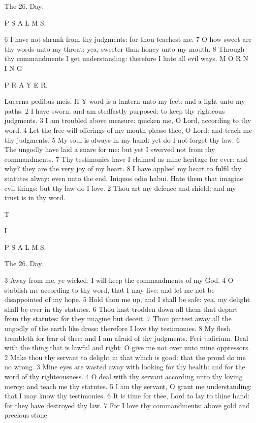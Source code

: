 The 26. Day.

P S A L M S.

6 I have not shrunk from thy judgments: for thou teachest me. 7 O how sweet are thy words unto my throat: yea, sweeter than honey unto my mouth. 8 Through thy commandments I get understanding: therefore I hate all evil ways. M O R N I N G

P R A Y E R.

Lucerna pedibus meis. H Y word is a lantern unto my feet: and a light unto my paths. 2 I have sworn, and am stedfastly purposed: to keep thy righteous judgments. 3 I am troubled above measure: quicken me, O Lord, according to thy word. 4 Let the free-will offerings of my mouth please thee, O Lord: and teach me thy judgments. 5 My soul is always in my hand: yet do I not forget thy law. 6 The ungodly have laid a snare for me: but yet I swerved not from thy commandments. 7 Thy testimonies have I claimed as mine heritage for ever: and why? they are the very joy of my heart. 8 I have applied my heart to fulfil thy statutes alway: even unto the end. Iniquos odio habui. Hate them that imagine evil things: but thy law do I love. 2 Thou art my defence and shield: and my trust is in thy word.

T

I

P S A L M S.

The 26. Day.

3 Away from me, ye wicked: I will keep the commandments of my God. 4 O stablish me according to thy word, that I may live: and let me not be disappointed of my hope. 5 Hold thou me up, and I shall be safe: yea, my delight shall be ever in thy statutes. 6 Thou hast trodden down all them that depart from thy statutes: for they imagine but deceit. 7 Thou puttest away all the ungodly of the earth like dross: therefore I love thy testimonies. 8 My flesh trembleth for fear of thee: and I am afraid of thy judgments. Feci judicium. Deal with the thing that is lawful and right: O give me not over unto mine oppressors. 2 Make thou thy servant to delight in that which is good: that the proud do me no wrong. 3 Mine eyes are wasted away with looking for thy health: and for the word of thy righteousness. 4 O deal with thy servant according unto thy loving mercy: and teach me thy statutes. 5 I am thy servant, O grant me understanding: that I may know thy testimonies. 6 It is time for thee, Lord to lay to thine hand: for they have destroyed thy law. 7 For I love thy commandments: above gold and precious stone.

